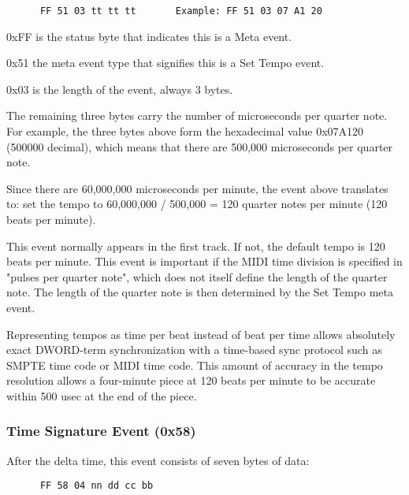    \begin{verbatim}
      FF 51 03 tt tt tt       Example: FF 51 03 07 A1 20
   \end{verbatim}

   \begin{enumber}
      \item 0xFF is the status byte that indicates this is a Meta event.
      \item 0x51 the meta event type that signifies this is a Set Tempo event.
      \item 0x03 is the length of the event, always 3 bytes.
      \item The remaining three bytes carry the number of microseconds per
         quarter note.  For example, the three bytes above form the hexadecimal
         value 0x07A120 (500000 decimal), which means that there are 500,000
         microseconds per quarter note.
   \end{enumber}

   Since there are 60,000,000 microseconds per minute, the event above
   translates to: set the tempo to 60,000,000 / 500,000 = 120 quarter notes per
   minute (120 beats per minute).

   This event normally appears in the first track. If not, the default tempo is
   120 beats per minute.  This event is important if the MIDI time division is
   specified in "pulses per quarter note", which does not itself define the
   length of the quarter note. The length of the quarter note is then
   determined by the Set Tempo meta event.

   Representing tempos as time per beat instead of beat per time allows
   absolutely exact DWORD-term synchronization with a time-based sync protocol
   such as SMPTE time code or MIDI time code.  This amount of accuracy
   in the tempo resolution allows a four-minute piece at 120 beats per minute
   to be accurate within 500 usec at the end of the piece.

\subsubsection{Time Signature Event (0x58)}
\label{subsubsec:midi_format_meta_time_sig}

   After the delta time, this event consists of seven bytes of data:

   \begin{verbatim}
      FF 58 04 nn dd cc bb
   \end{verbatim}

